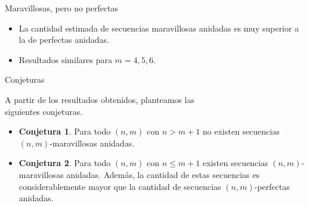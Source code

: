 \documentclass[spanish,xcolor={table}]{beamer}
\begin{document}
\begin{frame}{Maravillosas, pero no perfectas}

  
  \vspace{-.5em}

  \begin{itemize}
    \item La cantidad estimada de secuencias maravillosas anidadas es muy superior a la de perfectas anidadas.
    \item Resultados similares para $m = 4, 5, 6$.
  \end{itemize}
  
\end{frame}


\begin{frame}{Conjeturas}

A partir de los resultados obtenidos, planteamos las \\ siguientes conjeturas.

\begin{itemize}
	\item \textbf{Conjetura 1}. Para todo $(n,m)$ con $n > m + 1$ no existen
		secuencias $(n,m)$-maravillosas anidadas.
	\item \textbf{Conjetura 2}. Para todo $(n,m)$ con $n \leq m + 1$ existen
	secuencias $(n,m)$-maravillosas anidadas. Además, la cantidad de estas
	secuencias es considerablemente mayor que la cantidad de secuencias
	$(n,m)$-perfectas anidadas.
\end{itemize}

\end{frame}

\end{document}
